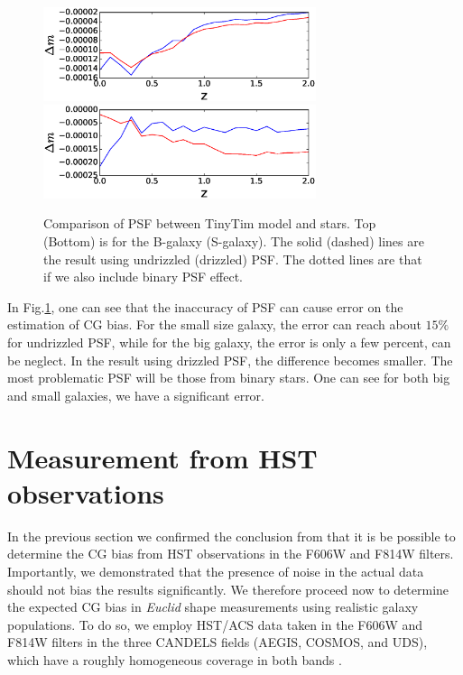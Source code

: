 \documentclass[useAMS,usenatbib]{mnras}
\begin{document}
%
\begin{figure}
\includegraphics[width=8.0cm]{ztinytim_b.eps}
\includegraphics[width=8.0cm]{ztinytim_s.eps}
\caption{Comparison of PSF between TinyTim model and stars.
  Top (Bottom) is for the B-galaxy (S-galaxy). The solid (dashed) 
  lines are the result using undrizzled (drizzled) PSF. 
  The dotted lines are that if we also include binary PSF effect.}
\label{fig:psfacc2}
\end{figure}
%
In Fig.\ref{fig:psfacc2}, one can see that the inaccuracy of PSF can
cause error on the estimation of CG bias. For the small size galaxy,
the error can reach about $15\%$ for undrizzled PSF, while for the big
galaxy, the error is only a few percent, can be neglect. In the result
using drizzled PSF, the difference becomes smaller. The most
problematic PSF will be those from binary stars. One can see for both
big and small galaxies, we have a significant error.

\section{Measurement from HST observations}
\label{sec:candels}

In the previous section we confirmed the conclusion from  
that it is be possible to determine the CG bias from HST observations in the F606W 
and F814W filters. Importantly, we demonstrated that the presence of noise in the 
actual data should not bias the results significantly. We therefore proceed now to
determine the expected CG bias in {\it Euclid} shape measurements using
 realistic galaxy populations. To do so, we employ HST/ACS data taken in the F606W and F814W
filters in the three CANDELS fields (AEGIS, COSMOS, and UDS), which have
a roughly homogeneous coverage in both bands \citep[see][]{davis2007,grogin2011,Koekemoer11}.
\end{document}
